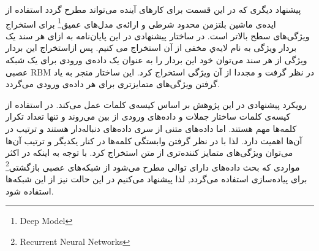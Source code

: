 
پیشنهاد دیگری که در این قسمت برای کارهای آینده می‌تواند مطرح گردد استفاده از اید‌ه‌ی ماشین بلتزمن محدود شرطی و ارائه‌ی مدل‌های عمیق\footnote{Deep Model}
برای استخراج ویژگی‌های سطح بالاتر است. در ساختار پیشنهادی در این پایان‌‌نامه به ازای هر سند یک بردار ویژگی به نام لایه‌ي مخفی
از آن استخراج می کنیم. پس ازاستخراج این بردار ویژگی از هر سند می‌توان خود این بردار را به عنوان یک داده‌ی ورودی برای یک شبکه عصبی 
RBM
در نظر گرفت و مجددا از آن ویژگی استخراج کرد. این ساختار منجر به یاد گرفتن ویژگی‌های متمایزتری برای هر داده‌ی ورودی می‌گردد.

رویکرد پیشنهادی در این پژوهش بر اساس کیسه‌ی کلمات عمل می‌کند. در استفاده از کیسه‌ی کلمات ساختار جملات و داده‌های ورودی از بین می‌روند و تنها تعداد تکرار کلمه‌ها مهم هستند. اما داده‌های متنی از سری داده‌های دنباله‌دار هستند و ترتیب در آن‌ها اهمیت دارد. لذا با در نظر گرفتن وابستگی کلمه‌ها در کنار یکدیگر و ترتیب آن‌ها می‌توان ویژگی‌های متمایز کننده‌تری از متن استخراج کرد. با توجه به اینکه در اکثر مواردی که بحث داده‌های دارای توالی مطرح می‌شود از شبکه‌های عصبی بازگشتی\footnote{Recurrent Neural Networks}
برای پياده‌سازی استفاده می‌گردد, لذا پیشنهاد می‌کنیم در این حالت نیز از این شبکه‌ها استفاده شود.

%
